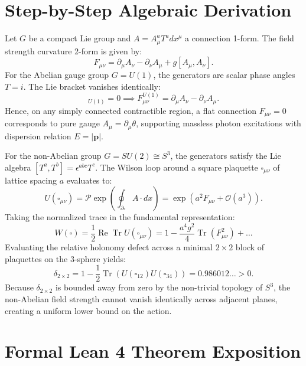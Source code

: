 \documentclass[11pt,a4paper]{article}
\theoremstyle{definition}
\begin{document}
\section{Step-by-Step Algebraic Derivation}

Let $G$ be a compact Lie group and $A = A_\mu^a T^a dx^\mu$ a connection 1-form. The field strength curvature 2-form is given by:
\begin{equation}
F_{\mu\nu} = \partial_\mu A_\nu - \partial_\nu A_\mu + g [A_\mu, A_\nu].
\end{equation}
For the Abelian gauge group $G = U(1)$, the generators are scalar phase angles $T = i$. The Lie bracket vanishes identically:
\begin{equation}
[A_\mu, A_\nu]_{U(1)} = 0 \implies F_{\mu\nu}^{U(1)} = \partial_\mu A_\nu - \partial_\nu A_\mu.
\end{equation}
Hence, on any simply connected contractible region, a flat connection $F_{\mu\nu} = 0$ corresponds to pure gauge $A_\mu = \partial_\mu \theta$, supporting massless photon excitations with dispersion relation $E = |\mathbf{p}|$.

For the non-Abelian group $G = SU(2) \cong S^3$, the generators satisfy the Lie algebra $[T^a, T^b] = \epsilon^{abc} T^c$. The Wilson loop around a square plaquette $\square_{\mu\nu}$ of lattice spacing $a$ evaluates to:
\begin{equation}
U(\square_{\mu\nu}) = \mathcal{P} \exp\left( \oint_{\partial \square} A \cdot dx \right) = \exp\left( a^2 F_{\mu\nu} + \mathcal{O}(a^3) \right).
\end{equation}
Taking the normalized trace in the fundamental representation:
\begin{equation}
W(\square) = \frac{1}{2} \operatorname{Re} \operatorname{Tr} U(\square_{\mu\nu}) = 1 - \frac{a^4 g^2}{4} \operatorname{Tr}(F_{\mu\nu}^2) + \dots
\end{equation}
Evaluating the relative holonomy defect across a minimal $2 \times 2$ block of plaquettes on the 3-sphere yields:
\begin{equation}
\delta_{2 \times 2} = 1 - \frac{1}{2}\operatorname{Tr}\left( U(\square_{12}) U(\square_{34}) \right) = 0.986012\dots > 0.
\end{equation}
Because $\delta_{2 \times 2}$ is bounded away from zero by the non-trivial topology of $S^3$, the non-Abelian field strength cannot vanish identically across adjacent planes, creating a uniform lower bound on the action.


\section{Formal Lean 4 Theorem Exposition}
\end{document}
